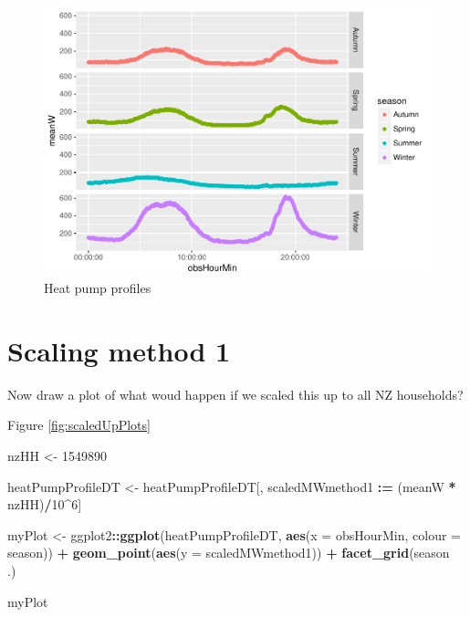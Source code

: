 \documentclass[]{article}
\newenvironment{Shaded}{\begin{snugshade}}{\end{snugshade}}
\newcommand{\KeywordTok}[1]{\textcolor[rgb]{0.13,0.29,0.53}{\textbf{#1}}}
\newcommand{\DataTypeTok}[1]{\textcolor[rgb]{0.13,0.29,0.53}{#1}}
\newcommand{\DecValTok}[1]{\textcolor[rgb]{0.00,0.00,0.81}{#1}}
\newcommand{\StringTok}[1]{\textcolor[rgb]{0.31,0.60,0.02}{#1}}
\newcommand{\OperatorTok}[1]{\textcolor[rgb]{0.81,0.36,0.00}{\textbf{#1}}}
\newcommand{\ErrorTok}[1]{\textcolor[rgb]{0.64,0.00,0.00}{\textbf{#1}}}
\newcommand{\NormalTok}[1]{#1}
\theoremstyle{definition}
\theoremstyle{definition}
\theoremstyle{definition}
\theoremstyle{remark}
\begin{document}
\begin{figure}
\centering
\includegraphics{heatPumpProfileAnalysis_files/figure-latex/profilePlot-1.pdf}
\caption{\label{fig:profilePlot}Heat pump profiles}
\end{figure}

\section{Scaling method 1}\label{scaling-method-1}

Now draw a plot of what woud happen if we scaled this up to all NZ
households?

Figure \ref{fig:scaledUpPlots}

\begin{Shaded}
\begin{Highlighting}[]
\NormalTok{nzHH <-}\StringTok{ }\DecValTok{1549890}

\NormalTok{heatPumpProfileDT <-}\StringTok{ }\NormalTok{heatPumpProfileDT[, scaledMWmethod1 }\OperatorTok{:}\ErrorTok{=}\StringTok{ }\NormalTok{(meanW }\OperatorTok{*}\StringTok{ }\NormalTok{nzHH)}\OperatorTok{/}\DecValTok{10}\OperatorTok{^}\DecValTok{6}\NormalTok{]}

\NormalTok{myPlot <-}\StringTok{ }\NormalTok{ggplot2}\OperatorTok{::}\KeywordTok{ggplot}\NormalTok{(heatPumpProfileDT, }\KeywordTok{aes}\NormalTok{(}\DataTypeTok{x =}\NormalTok{ obsHourMin, }\DataTypeTok{colour =}\NormalTok{ season)) }\OperatorTok{+}
\StringTok{  }\KeywordTok{geom_point}\NormalTok{(}\KeywordTok{aes}\NormalTok{(}\DataTypeTok{y =}\NormalTok{ scaledMWmethod1)) }\OperatorTok{+}
\StringTok{  }\KeywordTok{facet_grid}\NormalTok{(season }\OperatorTok{~}\StringTok{ }\NormalTok{.)}

\NormalTok{myPlot}
\end{Highlighting}
\end{Shaded}
\end{document}
